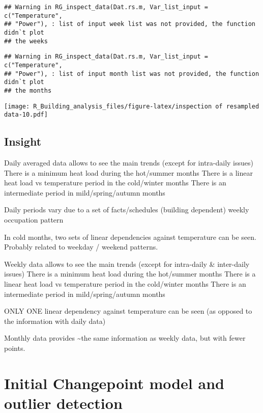 \documentclass[
]{article}
\begin{document}
\begin{verbatim}
## Warning in RG_inspect_data(Dat.rs.m, Var_list_input = c("Temperature",
## "Power"), : list of input week list was not provided, the function didn`t plot
## the weeks
\end{verbatim}

\begin{verbatim}
## Warning in RG_inspect_data(Dat.rs.m, Var_list_input = c("Temperature",
## "Power"), : list of input month list was not provided, the function didn`t plot
## the months
\end{verbatim}

\texttt{[image: R\_Building\_analysis\_files/figure-latex/inspection of resampled data-10.pdf]}

\hypertarget{insight-1}{%
\subsection{Insight}\label{insight-1}}

Daily averaged data allows to see the main trends (except for
intra-daily issues) There is a minimum heat load during the hot/summer
months There is a linear heat load vs temperature period in the
cold/winter months There is an intermediate period in mild/spring/autumn
months

Daily periods vary due to a set of facts/schedules (building dependent)
weekly occupation pattern

In cold months, two sets of linear dependencies against temperature can
be seen. Probably related to weekday / weekend patterns.

Weekly data allows to see the main trends (except for intra-daily \&
inter-daily issues) There is a minimum heat load during the hot/summer
months There is a linear heat load vs temperature period in the
cold/winter months There is an intermediate period in mild/spring/autumn
months

ONLY ONE linear dependency against temperature can be seen (as opposed
to the information with daily data)

Monthly data provides \textasciitilde the same information as weekly
data, but with fewer points.

\hypertarget{initial-changepoint-model-and-outlier-detection}{%
\section{Initial Changepoint model and outlier
detection}\label{initial-changepoint-model-and-outlier-detection}}
\end{document}
